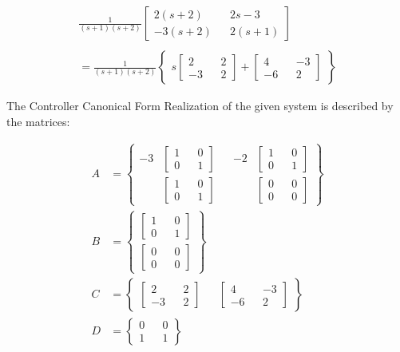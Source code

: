 \documentclass[paper=a4,margin, fontsize=11pt]{scrartcl} %
\numberwithin{equation}{section} %
\numberwithin{figure}{section} %
\numberwithin{table}{section} %
\begin{document}
\begin{align*}
\frac{1}{(s+1)(s+2)}\begin{bmatrix}2(s+2) && 2s-3 \\ -3(s+2) && 2(s+1)\end{bmatrix}\\
\\
=\frac{1}{(s+1)(s+2)}\begin{Bmatrix}s\begin{bmatrix} 2 && 2\\-3 && 2\end{bmatrix} + \begin{bmatrix}4 && -3 \\ -6 && 2\end{bmatrix} \end{Bmatrix}
\end{align*}

The Controller Canonical Form Realization of the given system is described by the matrices:

\begin{align*}
A&=\begin{Bmatrix}-3&\begin{bmatrix}1 && 0\\ 0 && 1 \end{bmatrix} && -2&\begin{bmatrix}1 && 0\\0 && 1\end{bmatrix}\\&\begin{bmatrix}1 && 0\\0 &&1\end{bmatrix} && &\begin{bmatrix}0 && 0\\ 0 && 0\end{bmatrix}\end{Bmatrix}\\
B&=\begin{Bmatrix}
\begin{bmatrix}1 && 0\\0 && 1\end{bmatrix}\\\begin{bmatrix}0 && 0\\0 && 0\end{bmatrix}\end{Bmatrix}\\
C&=\begin{Bmatrix}
\begin{bmatrix}2 && 2\\-3 && 2\end{bmatrix} && \begin{bmatrix}4 && -3\\-6 && 2\end{bmatrix}\end{Bmatrix}\\
D&=\begin{Bmatrix}0 && 0\\1 && 1\end{Bmatrix}
\end{align*}
\end{document}
